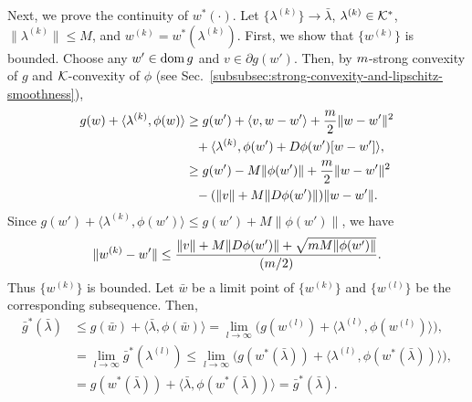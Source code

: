 Next, we prove the continuity of $w^*(\cdot)$.
Let $\{\lambda^{(k)} \} \rightarrow \bar{\lambda}$, $\lambda^{(k)} \in \mathcal{K}^*$, $\lVert \lambda^{(k)} \rVert \leq M$, and $w^{(k)} = w^*(\lambda^{(k)})$.
First, we show that $\{w^{(k)}\}$ is bounded.
Choose any $w' \in \operatorname{dom}{g}$ and $v \in \partial g(w')$.
Then, by $m$-strong convexity of $g$ and $\mathcal{K}$-convexity of $\phi$ (see Sec.~\ref{subsubsec:strong-convexity-and-lipschitz-smoothness}),
\begin{align*}
    g(w) + \langle \lambda^{(k)}, \phi(w)\rangle & \geq g(w') + \langle v, w - w'\rangle + \frac{m}{2} \lVert w - w'\rVert^2 \\
    & \text{\phantom{$\geq$}} + \langle \lambda^{(k)}, \phi(w') + D\phi(w') [w - w']\rangle, \\
    & \geq g(w') - M \lVert \phi(w')\rVert + \frac{m}{2} \lVert w - w'\rVert^2 \\
    & \text{\phantom{$\geq$}} - (\lVert v\rVert + M \lVert D \phi(w') \rVert) \lVert w - w'\rVert.
\end{align*}
Since $g(w') + \langle \lambda^{(k)}, \phi(w')\rangle \leq g(w') + M \lVert \phi(w')\rVert$, we have
\begin{equation*}
    \lVert w^{(k)} - w' \rVert \leq \frac{ \lVert v\rVert + M \lVert D \phi(w') \rVert + \sqrt{m M \lVert \phi(w')\rVert}}{(m/2)}.
\end{equation*}
Thus $\{w^{(k)} \}$ is bounded.
Let $\bar{w}$ be a limit point of $\{w^{(k)}\}$ and $\{w^{(l)}\}$ be the corresponding subsequence.
Then,
\begin{align*}
    \bar{g}^*(\bar{\lambda}) & \leq g(\bar{w}) + \langle \bar{\lambda}, \phi(\bar{w})\rangle = \lim_{l \rightarrow \infty} \bigl(g(w^{(l)}) + \langle \lambda^{(l)}, \phi(w^{(l)})\rangle \bigr), \\
    & = \lim_{l \rightarrow \infty} \bar{g}^*(\lambda^{(l)}) \leq \lim_{l \rightarrow \infty} \bigl(g(w^*(\bar{\lambda})) + \langle \lambda^{(l)}, \phi(w^*(\bar{\lambda}))\rangle\bigr), \\
    & = g(w^*(\bar{\lambda})) + \langle \bar{\lambda}, \phi(w^*(\bar{\lambda}))\rangle = \bar{g}^*(\bar{\lambda}).
\end{align*}
